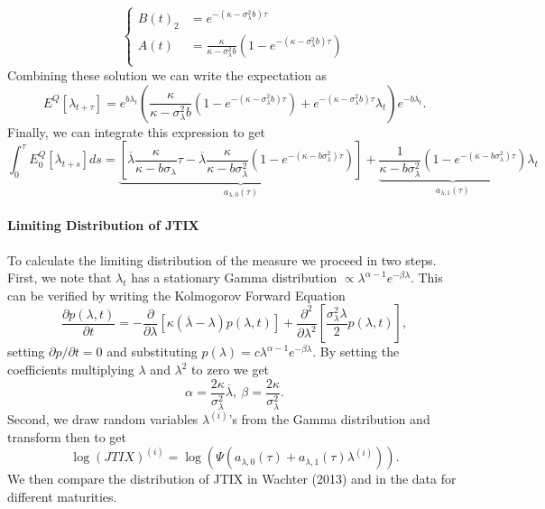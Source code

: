 \documentclass[11pt]{article}
\begin{document}
\[
    \left\{\begin{aligned}
        B(t)_2 &= e^{-(\kappa - \sigma_\lambda^2 b)\tau} \\
        A(t) &= \frac{\kappa}{\kappa - \sigma_\lambda^2 b}\left(1-e^{-(\kappa-\sigma_\lambda^2 b)\tau}\right)\\
    \end{aligned} \right. 
\]
Combining these solution we can write the expectation as
\[E^Q[\lambda_{t+\tau}] = e^{b\lambda_t}\left(\frac{\kappa}{\kappa - \sigma_\lambda^2 b}\left(1-e^{-(\kappa-\sigma_\lambda^2 b)\tau}\right) + e^{-(\kappa - \sigma_\lambda^2 b)\tau}\lambda_t\right)e^{-b\lambda_t}.\]
Finally, we can integrate this expression to get
\[\int_0^\tau E^Q_0[\lambda_{t+s}]ds = \underbrace{\left[\overline{\lambda}\frac{\kappa}{\kappa - b\sigma_\lambda}\tau - \overline{\lambda}\frac{\kappa}{\kappa - b\sigma_\lambda^2}\left(1-e^{-(\kappa - b\sigma_\lambda^2)\tau}\right)\right]}_{a_{\lambda, 0}(\tau)} + \underbrace{\frac{1}{\kappa - b \sigma_\lambda^2}\left(1-e^{-(\kappa-b\sigma_\lambda^2)\tau}\right)}_{a_{\lambda,1}(\tau)}\lambda_t\]

\paragraph{Limiting Distribution of JTIX}

To calculate the limiting distribution of the measure we proceed in two steps. First, we note that $\lambda_t$ has a stationary Gamma distribution $\propto \lambda^{\alpha - 1}e^{-\beta \lambda}$. This can be verified by writing the Kolmogorov Forward Equation
\[\frac{\partial p(\lambda, t)}{\partial t} = -\frac{\partial }{\partial \lambda}[\kappa(\overline{\lambda} - \lambda)p(\lambda, t)] + \frac{\partial^2}{\partial \lambda^2}\left[\frac{\sigma_\lambda^2 \lambda}{2}p(\lambda,t)\right],\]
setting $\partial p/\partial t = 0$ and substituting $p(\lambda) = c \lambda^{\alpha - 1}e^{-\beta \lambda}$. By setting the coefficients multiplying $\lambda$ and $\lambda^2$ to zero we get
\[\alpha = \frac{2\kappa}{\sigma_\lambda^2}\overline{\lambda}, \ \beta = \frac{2\kappa}{\sigma_\lambda^2}.\]
Second, we draw random variables $\lambda^{(i)}$'s from the Gamma distribution and transform then to get 
\[\log(JTIX)^{(i)} = \log(\Psi(a_{\lambda,0}(\tau) + a_{\lambda,1}(\tau)\lambda^{(i)})).\]
We then compare the distribution of JTIX in Wachter (2013) and in the data for different maturities.
\end{document}
